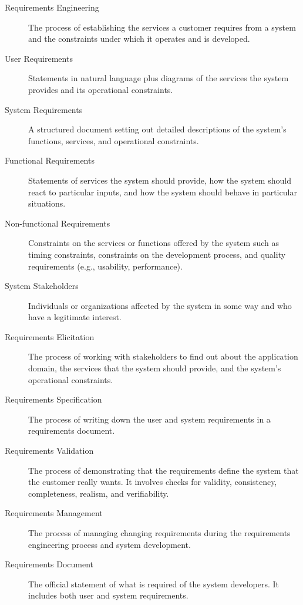 \documentclass{article}
\begin{document}
\begin{description}
  \item[Requirements Engineering] The process of establishing the services a customer requires from a system and the constraints under which it operates and is developed.
  
  \item[User Requirements] Statements in natural language plus diagrams of the services the system provides and its operational constraints.
  
  \item[System Requirements] A structured document setting out detailed descriptions of the system’s functions, services, and operational constraints.
  
  \item[Functional Requirements] Statements of services the system should provide, how the system should react to particular inputs, and how the system should behave in particular situations.
  
  \item[Non-functional Requirements] Constraints on the services or functions offered by the system such as timing constraints, constraints on the development process, and quality requirements (e.g., usability, performance).
  
  \item[System Stakeholders] Individuals or organizations affected by the system in some way and who have a legitimate interest.
  
  \item[Requirements Elicitation] The process of working with stakeholders to find out about the application domain, the services that the system should provide, and the system’s operational constraints.
  
  \item[Requirements Specification] The process of writing down the user and system requirements in a requirements document.
  
  \item[Requirements Validation] The process of demonstrating that the requirements define the system that the customer really wants. It involves checks for validity, consistency, completeness, realism, and verifiability.
  
  \item[Requirements Management] The process of managing changing requirements during the requirements engineering process and system development.
  
  \item[Requirements Document] The official statement of what is required of the system developers. It includes both user and system requirements.
  

\end{description}
\end{document}
